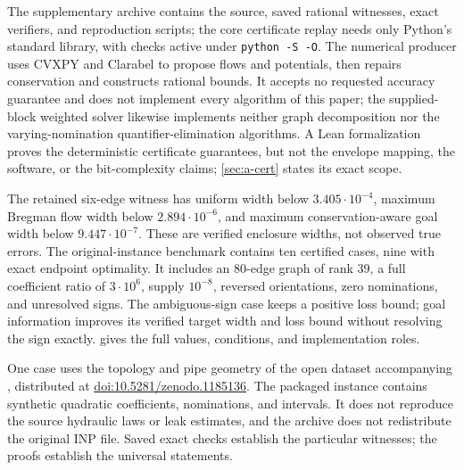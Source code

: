 The supplementary archive contains the source, saved rational
witnesses, exact verifiers, and reproduction scripts; the core
certificate replay needs only Python's standard library, with checks
active under \texttt{python -S -O}. The numerical producer uses CVXPY and Clarabel to
propose flows and potentials, then repairs conservation and constructs
rational bounds. It accepts no requested accuracy guarantee and does
not implement every algorithm of this paper; the supplied-block weighted
solver likewise implements neither graph decomposition nor the
varying-nomination quantifier-elimination algorithms. A Lean
formalization proves the deterministic certificate guarantees, but not
the envelope mapping, the software, or the bit-complexity claims;
\cref{sec:a-cert} states its exact scope.

The retained six-edge witness has uniform width below
$3.405\cdot10^{-4}$, maximum Bregman flow width below
$2.894\cdot10^{-6}$, and maximum conservation-aware goal width below
$9.447\cdot10^{-7}$. These are verified enclosure widths, not observed
true errors. The original-instance benchmark contains ten certified
cases, nine with exact endpoint optimality. It includes an 80-edge graph
of rank 39, a full coefficient ratio of $3\cdot10^6$, supply
$10^{-8}$, reversed orientations, zero nominations, and unresolved signs.
The ambiguous-sign case keeps a positive loss bound; goal information
improves its verified target width and loss bound without resolving the
sign exactly.  gives the full values, conditions, and
implementation roles.

One case uses the topology and pipe geometry of the open dataset
accompanying \citet{vrachimis2018-hydraulic}, distributed at
\href{https://doi.org/10.5281/zenodo.1185136}{doi:10.5281/zenodo.1185136}.
The packaged instance contains synthetic quadratic coefficients,
nominations, and intervals. It does not reproduce the source hydraulic
laws or leak estimates, and the archive does not redistribute the
original INP file. Saved exact checks establish the particular witnesses; the proofs establish
the universal statements.
